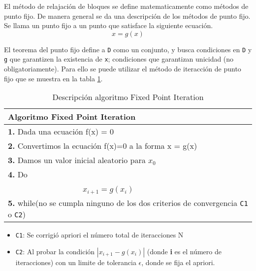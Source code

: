 El m\'etodo de relajaci\'on de bloques se define matematicamente como m\'etodos de punto fijo. De manera general se da una descripci\'on de los m\'etodos de punto fijo. Se llama un punto fijo a un punto que satisface la siguiente ecuaci\'on.\\

\begin{equation}
  x=g(x)
\end{equation}

El teorema del punto fijo define a \texttt{D} como un conjunto, y busca condiciones en \texttt{D} y \texttt{g} que garantizen la existencia de \texttt{x}; condiciones que garantizan unicidad (no obligatoriamente). Para ello se puede utilizar el m\'etodo de iteracci\'on de punto fijo que se muestra en la tabla \ref{table:br}. \\


\begin{table} [H]
     \centering
  \begin{tabular}{|l|}
 
    \hline \hline
    \textbf{Algoritmo} Fixed Point Iteration \\
    \hline \hline
    
   
    \textbf{1.} Dada una ecuaci\'on f(x) = 0 \\
    
    \textbf{2.} Convertimos la ecuaci\'on f(x)=0 a la forma x = g(x)\\
    
    \textbf{3.} Damos un valor inicial aleatorio para $x_{0}$\\
    
    
    \textbf{4.} Do  \\

     \ \ \ \ \ \ \ \ \ \ \ \ \ \ \ \ \ \ \ \textbf{$x_{i+1} = g(x_{i})$}\\
 
    \textbf{5.} while(no se cumpla ninguno de los dos criterios de convergencia \texttt{C1} o \texttt{C2})\\
      
    \hline
    
  \end{tabular}
  \caption{Descripci\'on algoritmo Fixed Point Iteration}
  \label{table:br}
\end{table}


\begin{itemize}
\item \texttt{C1}: Se corrigi\'o apriori el n\'umero total de iteracciones N
\item \texttt{C2}: Al probar la condici\'on $|x_{i+1}-g(x_{i})|$ (donde \textbf{i} es el n\'umero de iteracciones) con un limite de tolerancia $\epsilon$, donde se fija el apriori. 
\end{itemize}


